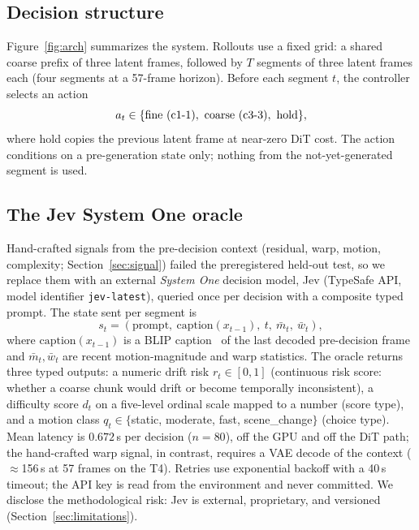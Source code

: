 \documentclass[journal]{IEEEtran}
\newcommand{\cfine}{\textup{c1-1}}
\newcommand{\ccoarse}{\textup{c3-3}}
\begin{document}
\subsection{Decision structure}
\label{sec:decision}
Figure~\ref{fig:arch} summarizes the system. Rollouts use a fixed grid: a shared coarse prefix of three latent frames, followed by $T$ segments of three latent frames each (four segments at a 57-frame horizon). Before each segment $t$, the controller selects an action
\begin{equation}
a_t \in \{\text{fine } (\cfine),\ \text{coarse } (\ccoarse),\ \text{hold}\},
\end{equation}
where hold copies the previous latent frame at near-zero DiT cost. The action conditions on a pre-generation state only; nothing from the not-yet-generated segment is used.

\subsection{The Jev System One oracle}
\label{sec:jev}
Hand-crafted signals from the pre-decision context (residual, warp, motion, complexity; Section~\ref{sec:signal}) failed the preregistered held-out test, so we replace them with an external \emph{System One} decision model, Jev (TypeSafe API, model identifier \texttt{jev-latest}), queried once per decision with a composite typed prompt. The state sent per segment is
\begin{equation}
s_t = (\text{prompt},\ \text{caption}(x_{t-1}),\ t,\ \bar{m}_t,\ \bar{w}_t),
\end{equation}
where $\text{caption}(x_{t-1})$ is a BLIP caption~\cite{li2022blip} of the last decoded pre-decision frame and $\bar{m}_t,\bar{w}_t$ are recent motion-magnitude and warp statistics. The oracle returns three typed outputs: a numeric drift risk $r_t \in [0,1]$ (continuous risk score: whether a coarse chunk would drift or become temporally inconsistent), a difficulty score $d_t$ on a five-level ordinal scale mapped to a number (score type), and a motion class $q_t \in \{$static, moderate, fast, scene\_change$\}$ (choice type). Mean latency is $0.672$\,s per decision ($n{=}80$), off the GPU and off the DiT path; the hand-crafted warp signal, in contrast, requires a VAE decode of the context ($\approx$156\,s at 57 frames on the T4). Retries use exponential backoff with a 40\,s timeout; the API key is read from the environment and never committed. We disclose the methodological risk: Jev is external, proprietary, and versioned (Section~\ref{sec:limitations}).
\end{document}
